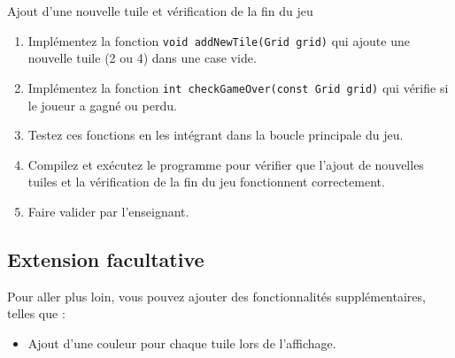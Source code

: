 \begin{UPSTIManipulation}{Ajout d'une nouvelle tuile et vérification de la fin du jeu}
    \begin{enumerate}
        \item Implémentez la fonction \texttt{void addNewTile(Grid grid)} qui ajoute une nouvelle tuile (2 ou 4) dans une case vide.
        \item Implémentez la fonction \texttt{int checkGameOver(const Grid grid)} qui vérifie si le joueur a gagné ou perdu.
        \item Testez ces fonctions en les intégrant dans la boucle principale du jeu.
        \item Compilez et exécutez le programme pour vérifier que l'ajout de nouvelles tuiles et la vérification de la fin du jeu fonctionnent correctement.
        \item Faire valider par l'enseignant.
    \end{enumerate}
\end{UPSTIManipulation}

\subsection{Extension facultative}
Pour aller plus loin, vous pouvez ajouter des fonctionnalités supplémentaires, telles que :
\begin{itemize}
    \item Ajout d'une couleur pour chaque tuile lors de l'affichage.
\end{itemize}